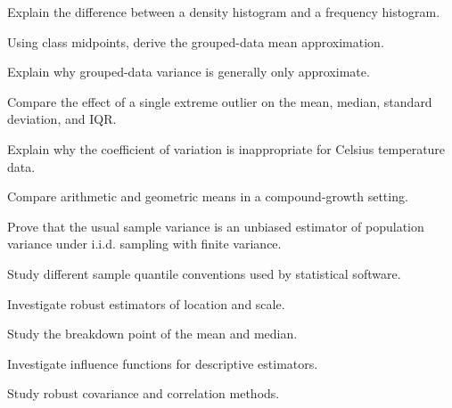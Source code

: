 \begin{exercise}[3]
Explain the difference between a density histogram and a frequency
histogram.
\end{exercise}

\begin{exercise}[3]
Using class midpoints, derive the grouped-data mean approximation.
\end{exercise}

\begin{exercise}[3]
Explain why grouped-data variance is generally only approximate.
\end{exercise}

\begin{exercise}[3]
Compare the effect of a single extreme outlier on the mean, median,
standard deviation, and IQR.
\end{exercise}

\begin{exercise}[3]
Explain why the coefficient of variation is inappropriate for Celsius
temperature data.
\end{exercise}

\begin{exercise}[3]
Compare arithmetic and geometric means in a compound-growth setting.
\end{exercise}

\begin{exercise}[4]
Prove that the usual sample variance is an unbiased estimator of
population variance under i.i.d. sampling with finite variance.
\end{exercise}

\begin{exercise}[4]
Study different sample quantile conventions used by statistical
software.
\end{exercise}

\begin{exercise}[4]
Investigate robust estimators of location and scale.
\end{exercise}

\begin{exercise}[4]
Study the breakdown point of the mean and median.
\end{exercise}

\begin{exercise}[4]
Investigate influence functions for descriptive estimators.
\end{exercise}

\begin{exercise}[4]
Study robust covariance and correlation methods.
\end{exercise}

